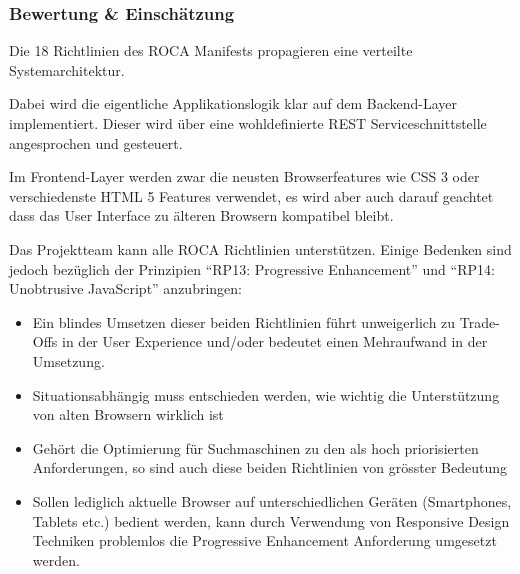\subsubsection*{Bewertung \protect\& Einschätzung}
Die 18 Richtlinien des ROCA Manifests \cite{ROCA} propagieren eine verteilte Systemarchitektur.

Dabei wird die eigentliche Applikationslogik klar auf dem Backend-Layer implementiert. Dieser wird über eine wohldefinierte REST Serviceschnittstelle  angesprochen und gesteuert.

Im Frontend-Layer werden zwar die neusten Browserfeatures wie CSS 3 oder verschiedenste HTML 5 Features verwendet, es wird aber auch darauf geachtet dass das User Interface zu älteren Browsern kompatibel bleibt.

Das Projektteam kann alle ROCA Richtlinien unterstützen. Einige Bedenken sind jedoch bezüglich der Prinzipien ``RP13: Progressive Enhancement'' und ``RP14: Unobtrusive JavaScript'' anzubringen:

\begin{itemize}
	\item Ein blindes Umsetzen dieser beiden Richtlinien führt unweigerlich zu Trade-Offs in der User Experience und/oder bedeutet einen Mehraufwand in der Umsetzung.
	\item Situationsabhängig muss entschieden werden, wie wichtig die Unterstützung von alten Browsern wirklich ist
	\item Gehört die Optimierung für Suchmaschinen zu den als hoch priorisierten Anforderungen, so sind auch diese beiden Richtlinien von grösster Bedeutung
	\item Sollen lediglich aktuelle Browser auf unterschiedlichen Geräten (Smartphones, Tablets etc.) bedient werden, kann durch Verwendung von Responsive Design Techniken \cite{ResponsiveDesign} problemlos die Progressive Enhancement Anforderung umgesetzt werden.
\end{itemize}